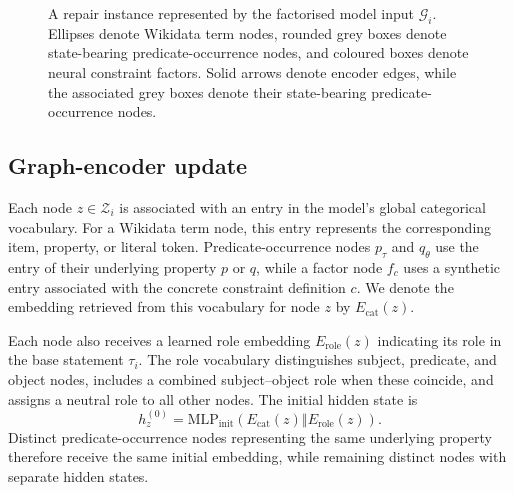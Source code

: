 \documentclass[a4paper,UKenglish,cleveref,autoref,thm-restate]{tgdk-v2021}
\begin{document}
\begin{figure}[H]
{%
}
\caption{A repair instance represented by the factorised model input \(\mathcal{G}_i\). Ellipses denote Wikidata term nodes, rounded grey boxes denote state-bearing predicate-occurrence nodes, and coloured boxes denote neural constraint factors. Solid arrows denote encoder edges, while the associated grey boxes denote their state-bearing predicate-occurrence nodes. %
}
\label{fig:subgraph-model}
\end{figure}

\subsection{Graph-encoder update}
\label{subsec:encoder-update}

Each node \(z\in\mathcal{Z}_i\) is associated with an entry in the model's global categorical vocabulary. For a Wikidata term node, this entry represents the corresponding item, property, or literal token. Predicate-occurrence nodes \(p_\tau\) and \(q_\theta\) use the entry of their underlying property \(p\) or \(q\), while a factor node \(f_c\) uses a synthetic entry associated with the concrete constraint definition \(c\). We denote the embedding retrieved from this vocabulary for node \(z\) by \(E_{\mathrm{cat}}(z)\).

Each node also receives a learned role embedding \(E_{\mathrm{role}}(z)\) indicating its role in the base statement \(\tau_i\). The role vocabulary distinguishes subject, predicate, and object nodes, includes a combined subject--object role when these coincide, and assigns a neutral role to all other nodes. The initial hidden state is
\[
h_z^{(0)}=\mathrm{MLP}_{\mathrm{init}}\left(E_{\mathrm{cat}}(z)\mathbin\Vert E_{\mathrm{role}}(z)\right).
\]
Distinct predicate-occurrence nodes representing the same underlying property therefore receive the same initial embedding, while remaining distinct nodes with separate hidden states.
\end{document}

